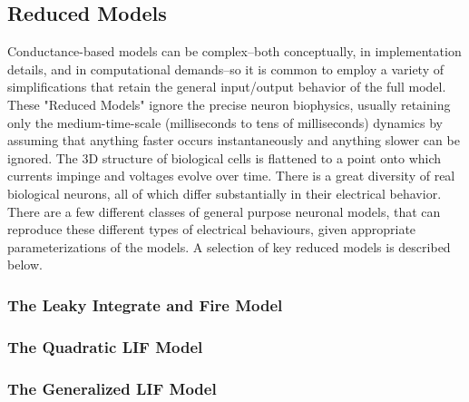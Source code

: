\subsection{Reduced Models}
Conductance-based models can be complex--both conceptually, in implementation details, and in computational demands--so it is common to employ a variety of simplifications that retain the general input/output behavior of the full model.
These "Reduced Models" ignore the precise neuron biophysics, usually retaining only the medium-time-scale (milliseconds to tens of milliseconds) dynamics by assuming that anything faster occurs instantaneously and anything slower can be ignored.
The 3D structure of biological cells is flattened to a point onto which currents impinge and voltages evolve over time. There is a great diversity of real biological neurons, all of which differ substantially in their electrical behavior. There are a few different classes of general purpose neuronal models, that can reproduce these different types of electrical behaviours, given appropriate parameterizations of the models. A selection of key reduced models is described below.
\subsubsection{The Leaky Integrate and Fire Model}
\subsubsection{The Quadratic LIF Model}
\subsubsection{The Generalized LIF Model}

